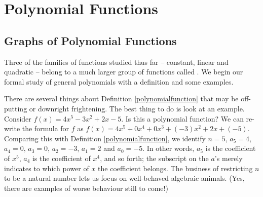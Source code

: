 \section{Polynomial Functions}
\subsection{Graphs of Polynomial Functions}
\label{GraphsofPolynomials}

Three of the families of functions studied thus far -- constant, linear and  quadratic -- belong to a much larger group of functions called .  We begin our formal study of general polynomials with a definition and some examples.

\smallskip


\smallskip

There are several things about Definition \ref{polynomialfunction} that may be off-putting or downright frightening.  The best thing to do is look at an example.  Consider $f(x) = 4x^5 - 3x^2 + 2x - 5$.  Is this a polynomial function?  We can re-write the formula for $f$ as $f(x)= 4x^5 + 0 x^{4} + 0 x^{3} + (-3)x^2 + 2 x + (-5).$  Comparing this with Definition \ref{polynomialfunction}, we identify $n=5$, $a_{5} = 4$, $a_{4} = 0$, $a_{3} = 0$, $a_{2} = -3$, $a_{1} = 2$ and $a_{0} = -5$.  In other words, $a_{5}$ is the coefficient of $x^{5}$, $a_{4}$ is the coefficient of $x^{4}$, and so forth;  the subscript on the $a$'s merely indicates to which power of $x$ the coefficient belongs.  The business of restricting $n$ to be a natural number lets us focus on well-behaved algebraic animals. (Yes, there are examples of worse behaviour still to come!)


\medskip

